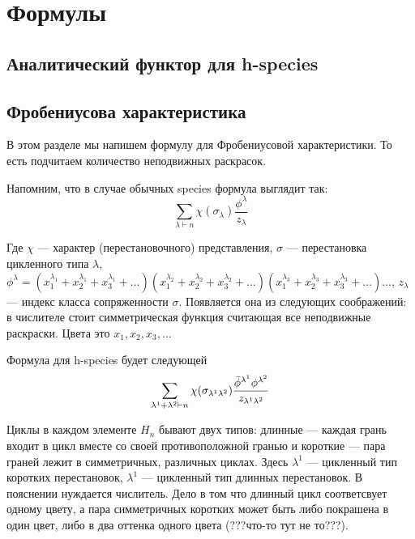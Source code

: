 \section{Формулы}

\subsection{Аналитический функтор для h-species}


\subsection{Фробениусова характеристика}

В этом разделе мы напишем формулу для Фробениусовой характеристики.
То есть подчитаем количество неподвижных раскрасок.

Напомним, что в случае обычных species формула выглядит так:
\begin{equation}
\label{eq:fr}
\sum_{\lambda \vdash n}\chi(\sigma_{\lambda}) \frac{\phi^{\lambda}}{z_{\lambda}}
\end{equation}

Где $\chi$ --- характер (перестановочного) представления, $\sigma$ ---
перестановка цикленного типа $\lambda$, 
$\phi^{\lambda} = 
(x_1^{\lambda_1} + x_2^{\lambda_1} + x_3^{\lambda_1} + \dots)
(x_1^{\lambda_2} + x_2^{\lambda_2} + x_3^{\lambda_2} + \dots)
(x_1^{\lambda_3} + x_2^{\lambda_3} + x_3^{\lambda_3} + \dots)
\dots$,
 $z_\lambda$ --- индекс класса сопряженности $\sigma$.
Появляется она из следующих соображений: в числителе стоит симметрическая
функция считающая все неподвижные раскраски. Цвета это $x_1, x_2, x_3, \dots$

Формула для h-species будет следующей
\begin{equation}
\label{eq:h-fr}
\sum_{\lambda^1 + \lambda^2 \vdash n}\chi(\sigma_{\lambda^1 \lambda^2})
\frac{\Bar{\phi}^{\lambda^1} \phi^{\lambda^2}}{z_{\lambda^1 \lambda^2}}
\end{equation}

Циклы в каждом элементе $H_n$ бывают двух типов:
длинные --- каждая грань входит в цикл вместе со своей противоположной гранью и
короткие --- пара граней лежит в симметричных, различных циклах. Здесь
$\lambda^1$ --- цикленный тип коротких перестановок, $\lambda^1$ --- цикленный тип длинных перестановок.
В пояснении нуждается числитель. Дело в том что длинный цикл соответсвует
одному цвету, а пара симметричных коротких может быть либо покрашена в один
цвет, либо в два оттенка одного цвета (???что-то тут не то???).
